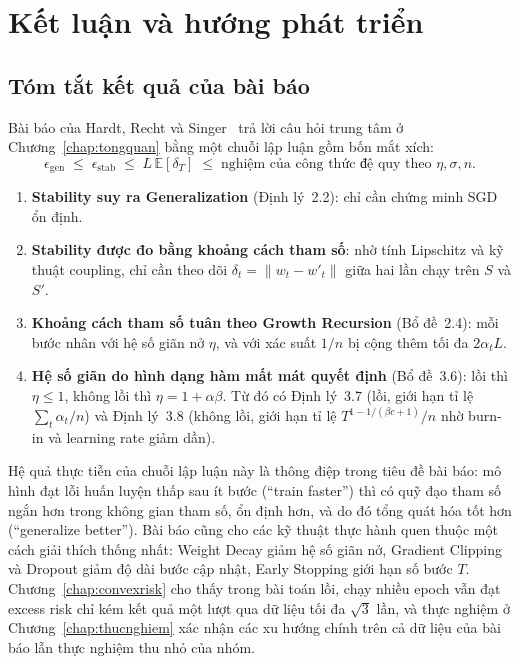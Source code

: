 \chapter{Kết luận và hướng phát triển}
\label{chap:ketluan}

\section{Tóm tắt kết quả của bài báo}
\label{sec:tomtat}

Bài báo của Hardt, Recht và Singer~\cite{hardt2016train} trả lời câu hỏi trung tâm ở Chương~\ref{chap:tongquan} bằng một chuỗi lập luận gồm bốn mắt xích:
\[
\epsilon_{\mathrm{gen}} \;\le\; \epsilon_{\mathrm{stab}} \;\le\; L\,\mathbb{E}[\delta_T] \;\le\; \text{nghiệm của công thức đệ quy theo } \eta, \sigma, n.
\]
\begin{enumerate}
    \item \textbf{Stability suy ra Generalization} (Định lý~2.2): chỉ cần chứng minh SGD ổn định.
    \item \textbf{Stability được đo bằng khoảng cách tham số}: nhờ tính Lipschitz và kỹ thuật coupling, chỉ cần theo dõi $\delta_t = \|w_t - w'_t\|$ giữa hai lần chạy trên $S$ và $S'$.
    \item \textbf{Khoảng cách tham số tuân theo Growth Recursion} (Bổ đề~2.4): mỗi bước nhân với hệ số giãn nở $\eta$, và với xác suất $1/n$ bị cộng thêm tối đa $2\alpha_t L$.
    \item \textbf{Hệ số giãn do hình dạng hàm mất mát quyết định} (Bổ đề~3.6): lồi thì $\eta \le 1$, không lồi thì $\eta = 1 + \alpha\beta$. Từ đó có Định lý~3.7 (lồi, giới hạn tỉ lệ $\sum_t \alpha_t / n$) và Định lý~3.8 (không lồi, giới hạn tỉ lệ $T^{1 - 1/(\beta c + 1)}/n$ nhờ burn-in và learning rate giảm dần).
\end{enumerate}

Hệ quả thực tiễn của chuỗi lập luận này là thông điệp trong tiêu đề bài báo: mô hình đạt lỗi huấn luyện thấp sau ít bước (``train faster'') thì có quỹ đạo tham số ngắn hơn trong không gian tham số, ổn định hơn, và do đó tổng quát hóa tốt hơn (``generalize better''). Bài báo cũng cho các kỹ thuật thực hành quen thuộc một cách giải thích thống nhất: Weight Decay giảm hệ số giãn nở, Gradient Clipping và Dropout giảm độ dài bước cập nhật, Early Stopping giới hạn số bước $T$. Chương~\ref{chap:convexrisk} cho thấy trong bài toán lồi, chạy nhiều epoch vẫn đạt excess risk chỉ kém kết quả một lượt qua dữ liệu tối đa $\sqrt{3}$ lần, và thực nghiệm ở Chương~\ref{chap:thucnghiem} xác nhận các xu hướng chính trên cả dữ liệu của bài báo lẫn thực nghiệm thu nhỏ của nhóm.

